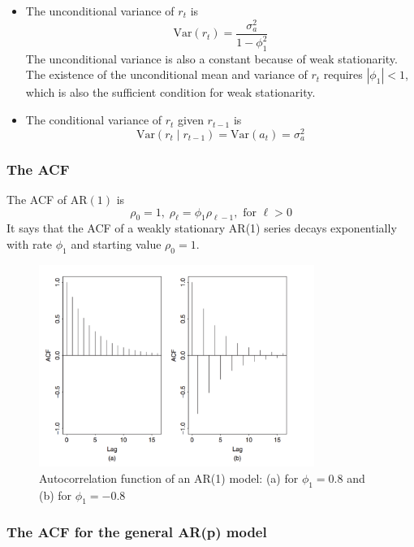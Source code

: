 \documentclass[a4paper,11pt]{article}
\newcommand{\var}{\mathrm{Var}}
\begin{document}
\begin{itemize}
\item The unconditional variance of \(r_t\) is
\[ \var(r_t) = \frac{\sigma^2_a}{1 - \phi_1^2} \]
The unconditional variance is also a constant because of weak
stationarity. The existence of the unconditional mean and variance
of \(r_t\) requires \(|\phi_1| < 1\), which is also the sufficient
condition for weak stationarity.

\item The conditional variance of \(r_t\) given \(r_{t-1}\) is
\[ \var(r_t \mid r_{t-1}) = \var(a_t) = \sigma^2_a \]
\end{itemize}

\subsubsection*{The ACF}
\label{sec:org8776cc1}

The ACF of \(\mathrm{AR}(1)\) is
\[\rho_0 = 1,\; \rho_{\ell} = \phi_1 \rho_{\ell-1}, \text{ for }
\ell>0 \]
It says that the ACF of a weakly stationary AR(1) series decays
exponentially with rate \(\phi_1\) and starting value \(\rho_0=1\).

\begin{figure}[htbp]
\centering
\includegraphics[width=0.8\textwidth,height=0.3\textheight]{img/acf_ar1.png}
\caption{\label{fig:org826f11a}
Autocorrelation function of an AR(1) model: (a) for \(\phi_1 = 0.8\) and (b) for \(\phi_1 = −0.8\)}
\end{figure}

\subsubsection*{The ACF for the general AR(p) model}
\label{sec:org98d7710}
\end{document}
